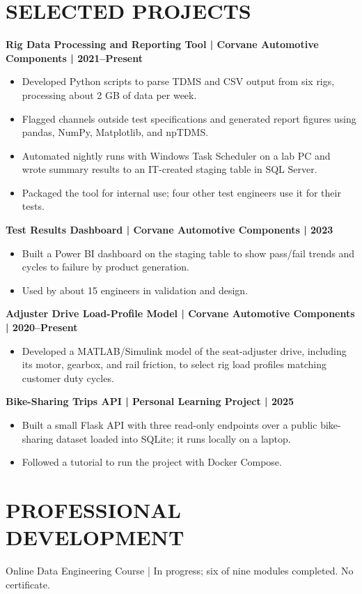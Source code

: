 \documentclass[11pt,a4paper]{article}
\begin{document}
\section*{SELECTED PROJECTS}
\textbf{Rig Data Processing and Reporting Tool | Corvane Automotive Components | 2021–Present}
\begin{itemize}
\item Developed Python scripts to parse TDMS and CSV output from six rigs, processing about 2 GB of data per week.
\item Flagged channels outside test specifications and generated report figures using pandas, NumPy, Matplotlib, and npTDMS.
\item Automated nightly runs with Windows Task Scheduler on a lab PC and wrote summary results to an IT-created staging table in SQL Server.
\item Packaged the tool for internal use; four other test engineers use it for their tests.
\end{itemize}

\textbf{Test Results Dashboard | Corvane Automotive Components | 2023}
\begin{itemize}
\item Built a Power BI dashboard on the staging table to show pass/fail trends and cycles to failure by product generation.
\item Used by about 15 engineers in validation and design.
\end{itemize}

\textbf{Adjuster Drive Load-Profile Model | Corvane Automotive Components | 2020–Present}
\begin{itemize}
\item Developed a MATLAB/Simulink model of the seat-adjuster drive, including its motor, gearbox, and rail friction, to select rig load profiles matching customer duty cycles.
\end{itemize}

\textbf{Bike-Sharing Trips API | Personal Learning Project | 2025}
\begin{itemize}
\item Built a small Flask API with three read-only endpoints over a public bike-sharing dataset loaded into SQLite; it runs locally on a laptop.
\item Followed a tutorial to run the project with Docker Compose.
\end{itemize}

\section*{PROFESSIONAL DEVELOPMENT}
Online Data Engineering Course | In progress; six of nine modules completed. No certificate.
\end{document}
